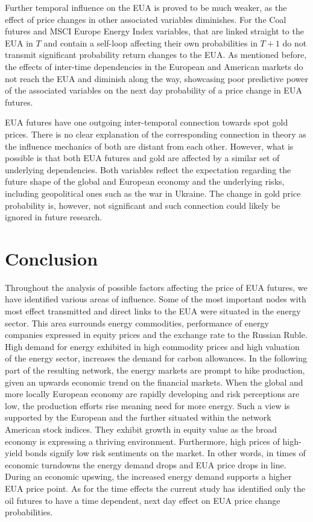 \documentclass[12pt, letterpaper]{article}
\begin{document}
Further temporal influence on the EUA is proved to be much weaker, as the effect of price changes in other associated variables diminishes. For the Coal futures and MSCI Europe Energy Index variables, that are linked straight to the EUA in $T$ and contain a self-loop affecting their own probabilities in $T+1$ do not transmit significant probability return changes to the EUA. As mentioned before, the effects of inter-time dependencies in the European and American markets do not reach the EUA and diminish along the way, showcasing poor predictive power of the associated variables on the next day probability of a price change in EUA futures.

EUA futures have one outgoing inter-temporal connection towards spot gold prices. There is no clear explanation of the corresponding connection in theory as the influence mechanics of both are distant from each other. However, what is possible is that both EUA futures and gold are affected by a similar set of underlying dependencies. Both variables reflect the expectation regarding the future shape of the global and European economy and the underlying risks, including geopolitical ones such as the war in Ukraine. The change in gold price probability is, however, not significant and such connection could likely be ignored in future research.

\section{Conclusion}

Throughout the analysis of possible factors affecting the price of EUA futures, we have identified various areas of influence. Some of the most important nodes with most effect transmitted and direct links to the EUA were situated in the energy sector. This area surrounds energy commodities, performance of energy companies expressed in equity prices and the exchange rate to the Russian Ruble. High demand for energy exhibited in high commodity prices and high valuation of the energy sector, increases the demand for carbon allowances. In the following part of the resulting network, the energy markets are prompt to hike production, given an upwards economic trend on the financial markets. When the global and more locally European economy are rapidly developing and risk perceptions are low, the production efforts rise meaning need for more energy. Such a view is supported by the European and the further situated within the network American stock indices. They exhibit growth in equity value as the broad economy is expressing a thriving environment. Furthermore, high prices of high-yield bonds signify low risk sentiments on the market. In other words, in times of economic turndowns the energy demand drops and EUA price drops in line. During an economic upswing, the increased energy demand supports a higher EUA price point. As for the time effects the current study has identified only the oil futures to have a time dependent, next day effect on EUA price change probabilities.
\end{document}
